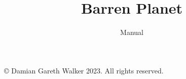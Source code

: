 \documentclass{book}
\title{Barren Planet}
\date{Manual}
\begin{document}
\maketitle
\null
\vfill
\noindent \copyright{} Damian Gareth Walker 2023.  All rights reserved.
\tableofcontents











%
%
%
%

\thispagestyle{empty}
\mbox{}
\end{document}
